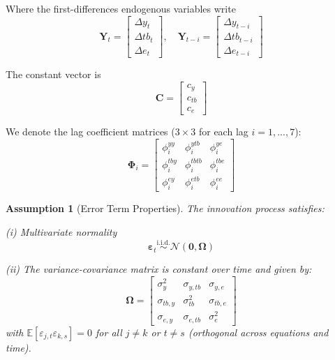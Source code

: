 \documentclass[
]{article}
\newtheorem{assumption}{Assumption} %
\begin{document}
Where the first-differences endogenous variables write
\begin{equation*}
\bm{Y}_t = \begin{bmatrix} 
\Delta y_t \\ 
\Delta tb_t \\ 
\Delta e_t 
\end{bmatrix}, \quad
\bm{Y}_{t-i} = \begin{bmatrix} 
\Delta y_{t-i} \\ 
\Delta tb_{t-i} \\ 
\Delta e_{t-i} 
\end{bmatrix}
\end{equation*}

The constant vector is 
\begin{equation*}
\bm{C} = \begin{bmatrix} 
c_y \\ 
c_{tb} \\ 
c_e 
\end{bmatrix}
\end{equation*}

We denote the lag coefficient matrices ($3 \times 3$ for each lag $i=1,...,7$):
\begin{equation*}
\bm{\Phi}_i = \begin{bmatrix}
\phi^{yy}_i & \phi^{ytb}_i & \phi^{ye}_i \\
\phi^{tby}_i & \phi^{tbtb}_i & \phi^{tbe}_i \\
\phi^{ey}_i & \phi^{etb}_i & \phi^{ee}_i
\end{bmatrix}
\end{equation*}

\begin{assumption}[Error Term Properties]\label{assump:errors}
The innovation process satisfies:

    (i) Multivariate normality 
    \begin{equation*}
    \bm{\varepsilon}_t \overset{\text{i.i.d.}}{\sim} \mathcal{N}\left( \bm{0}, \bm{\Omega} \right)
    \end{equation*}
    
    (ii) The variance-covariance matrix is constant over time and given by:
    \begin{equation}\label{eq:omega}
    \bm{\Omega} = \begin{bmatrix}
    \sigma^2_y & \sigma_{y,tb} & \sigma_{y,e} \\
    \sigma_{tb,y} & \sigma^2_{tb} & \sigma_{tb,e} \\
    \sigma_{e,y} & \sigma_{e,tb} & \sigma^2_e
    \end{bmatrix}
    \end{equation}
with $\mathbb{E}[\varepsilon_{j,t}\varepsilon_{k,s}] = 0$ for all $j \neq k$ or $t \neq s$ (orthogonal across equations and time).
\end{assumption}
\end{document}
